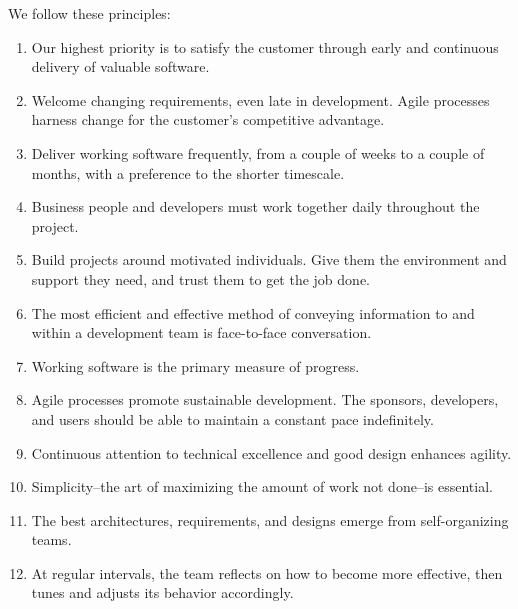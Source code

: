 We follow these principles:
\begin{enumerate}
    \item Our highest priority is to satisfy the customer through early and continuous delivery of valuable software.
    \item Welcome changing requirements, even late in development. Agile processes harness change for the customer's competitive advantage.
    \item Deliver working software frequently, from a couple of weeks to a couple of months, with a preference to the shorter timescale.
    \item Business people and developers must work together daily throughout the project.
    \item Build projects around motivated individuals. Give them the environment and support they need, and trust them to get the job done.
    \item The most efficient and effective method of conveying information to and within a development team is face-to-face conversation.
    \item Working software is the primary measure of progress.
    \item Agile processes promote sustainable development. The sponsors, developers, and users should be able to maintain a constant pace indefinitely.
    \item Continuous attention to technical excellence and good design enhances agility.
    \item Simplicity--the art of maximizing the amount of work not done--is essential.
    \item The best architectures, requirements, and designs emerge from self-organizing teams.
    \item At regular intervals, the team reflects on how to become more effective, then tunes and adjusts its behavior accordingly.
\end{enumerate}
